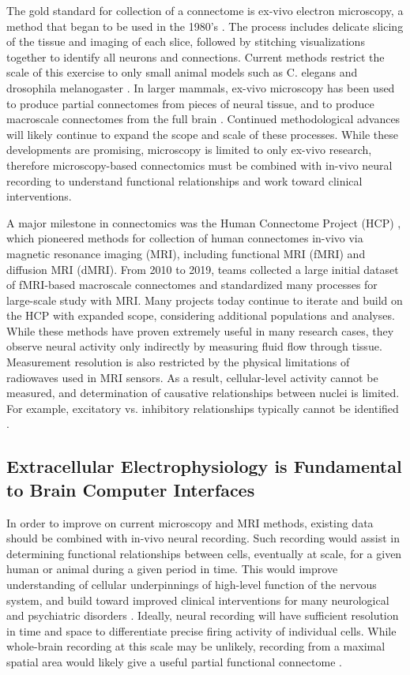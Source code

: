 \documentclass[11pt]{article}
\newcommand{\subsectionwithindent}[1]{
    \subsection*{#1}
    \hspace{\parindent} %
}
\begin{document}
The gold standard for collection of a connectome is ex-vivo electron microscopy, a method that began to be used in the 1980's \cite{white1986structure, emmons2015connectomics}. The process includes delicate slicing of the tissue and imaging of each slice, followed by stitching visualizations together to identify all neurons and connections. Current methods restrict the scale of this exercise to only small animal models such as C. elegans and drosophila melanogaster \cite{white1986structure, emmons2015connectomics, scheffer2020connectome}. In larger mammals, ex-vivo microscopy has been used to produce partial connectomes from pieces of neural tissue, and to produce macroscale connectomes from the full brain \cite{motta2019connectomicreconstruction, helmstaedter2011high, amunts2013bigbrain}. Continued methodological advances will likely continue to expand the scope and scale of these processes. While these developments are promising, microscopy is limited to only ex-vivo research, therefore microscopy-based connectomics must be combined with in-vivo neural recording to understand functional relationships and work toward clinical interventions.

A major milestone in connectomics was the Human Connectome Project (HCP) \cite{elam2021hcp}, which pioneered methods for collection of human connectomes in-vivo via magnetic resonance imaging (MRI), including functional MRI (fMRI) and diffusion MRI (dMRI). From 2010 to 2019, teams collected a large initial dataset of fMRI-based macroscale connectomes and standardized many processes for large-scale study with MRI. Many projects today continue to iterate and build on the HCP with expanded scope, considering additional populations and analyses. While these methods have proven extremely useful in many research cases, they observe neural activity only indirectly by measuring fluid flow through tissue. Measurement resolution is also restricted by the physical limitations of radiowaves used in MRI sensors. As a result, cellular-level activity cannot be measured, and determination of causative relationships between nuclei is limited. For example, excitatory vs. inhibitory relationships typically cannot be identified \cite{hagman2010mriconnectomics}.

\subsectionwithindent{Extracellular Electrophysiology is Fundamental to Brain Computer Interfaces}
In order to improve on current microscopy and MRI methods, existing data should be combined with in-vivo neural recording. Such recording would assist in determining functional relationships between cells, eventually at scale, for a given human or animal during a given period in time. This would improve understanding of cellular underpinnings of high-level function of the nervous system, and build toward improved clinical interventions for many neurological and psychiatric disorders \cite{kobayashi2025connections, zhang2025neds}. Ideally, neural recording will have sufficient resolution in time and space to differentiate precise firing activity of individual cells. While whole-brain recording at this scale may be unlikely, recording from a maximal spatial area would likely give a useful partial functional connectome \cite{jun2017probes}.
\end{document}
